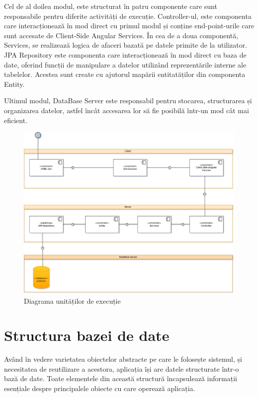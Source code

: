 \documentclass[12pt,a4paper]{report}
\theoremstyle{definition}
\theoremstyle{remark}
\begin{document}
\par Cel de al doilea modul, este structurat în patru componente care sunt responsabile pentru diferite activități de execuție. Controller-ul, este componenta care \textnormal{in\-te\-rac\-ți\-o\-nea\-ză} în mod direct cu primul modul și conține end-point-urile care sunt accesate de  Client-Side Angular Services. În cea de a doua componentă, Services, se realizează logica de afaceri bazată pe datele primite de la utilizator. JPA Repository este componenta care interacționează în mod direct cu baza de date, oferind funcții de manipulare a datelor utilizând reprezentările interne ale tabelelor. Acestea sunt create cu ajutorul mapării entitatăților din componenta Entity.

\par Ultimul modul, DataBase Server este responsabil pentru stocarea, structurarea și organizarea datelor, astfel încât accesarea lor să fie posibilă într-un mod cât mai eficient.

\begin{figure}[H]
    \centering
    \includegraphics[width=0.75\linewidth]{resurse/diagrame/DiagramaDEEXECUTIE.drawio.png}
    \caption{Diagrama unităților de execuție}
\end{figure}

\section{Structura bazei de date}\label{sec:architectura-bazei-de-date}
\par Având în vedere varietatea obiectelor abstracte pe care le folosește sistemul, și necesitatea de reutilizare a acestora, aplicația își are datele structurate într-o bază de date. Toate elementele din această structură încapsulează informații esențiale despre principalele obiecte cu care operează aplicația.
\end{document}
